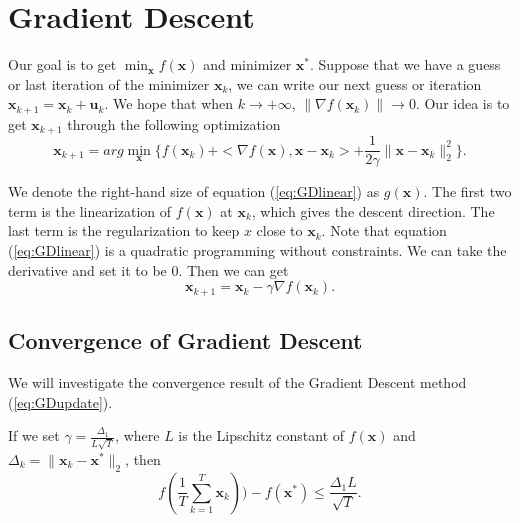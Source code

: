 \documentclass[12pt]{report}
\def\bx{\bm{x}}
\def\bu{\bm{u}}
\begin{document}
\section{Gradient Descent}

Our goal is to get $\min_{\bx} f(\bx)$ and minimizer $\bx^*$. Suppose that we have a guess or last iteration of the minimizer $\bx_k$, we can write our next guess or iteration $\bx_{k+1}=\bx_k + \bu_k$. We hope that when $k\to +\infty$, $\|\nabla f(\bx_k)\|\to 0$. Our idea is to get $\bx_{k+1}$ through the following optimization
\begin{equation}\label{eq:GDlinear}
\bx_{k+1} = arg\min_{\bx} \{f(\bx_k)+<\nabla f(\bx), \bx-\bx_k>+\frac{1}{2\gamma}\|\bx-\bx_k\|_2^2\}.
\end{equation}

We denote the right-hand size of equation (\ref{eq:GDlinear}) as $g(\bx)$. The first two term is the linearization of $f(\bx)$ at $\bx_k$, which gives the descent direction. The last term is the regularization to keep $x$ close to $\bx_k$. Note that equation (\ref{eq:GDlinear}) is a quadratic programming without constraints. We can take the derivative and set it to be 0. Then we can get
\begin{equation}\label{eq:GDupdate}
\bx_{k+1}=\bx_k-\gamma\nabla f(\bx_k).
\end{equation}

\subsection{Convergence of Gradient Descent}

We will investigate the convergence result of the Gradient Descent method (\ref{eq:GDupdate}).
\begin{theorem}
\label{ThmGD}
If we set $\gamma=\frac{\Delta_1}{L\sqrt{T}}$, where $L$ is the Lipschitz constant of $f(\bx)$ and $\Delta_k=\|\bx_k-\bx^*\|_2$, then
\begin{equation}
f(\frac{1}{T}\sum_{k=1}^T \bx_k))-f(\bx^*)\leq \frac{\Delta_1 L}{\sqrt{T}}.
\end{equation}
\end{theorem}
\end{document}
